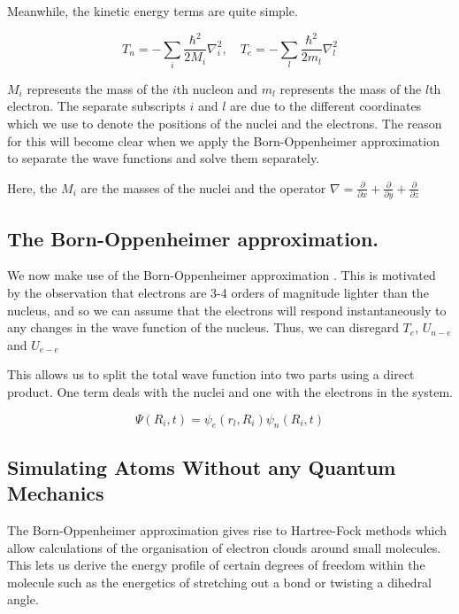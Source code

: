 Meanwhile, the kinetic energy terms are quite simple. 

\begin {equation}
T_n = - \sum_i \frac{\hbar^2}{2M_i} \nabla_i ^2,\quad  T_e = - \sum_l \frac{\hbar^2}{2m_l} \nabla_l ^2
\end {equation}

$M_i$ represents the mass of the $i$th nucleon and $m_l$ represents the mass of the $l$th electron. The separate subscripts $i$ and $l$ are due to the different coordinates which we use to denote the positions of the nuclei and the electrons. The reason for this will become clear when we apply the Born-Oppenheimer approximation to separate the wave functions and solve them separately.

Here, the $M_i$ are the masses of the nuclei and the operator $\nabla = \frac{\partial}{\partial x} + \frac{\partial }{\partial y} + \frac{\partial}{\partial z} $


\subsection{The Born-Oppenheimer approximation.}
We now make use of the Born-Oppenheimer approximation \cite{Born1927}. This is motivated by the observation that electrons are 3-4 orders of magnitude lighter than the nucleus, and so we can assume that the electrons will respond instantaneously to any changes in the wave function of the nucleus. Thus, we can disregard $T_e$, $U_{n-e}$ and $U_{e-e}$ 


This allows us to split the total wave function into two parts using a direct product. One term deals with the nuclei and one with the electrons in the system. 

\begin {equation}
\Psi(R_i,t) = \psi_e (r_l,R_i) \psi_n(R_i,t)
\end {equation}

\subsection{Simulating Atoms Without any Quantum Mechanics}
The Born-Oppenheimer approximation gives rise to Hartree-Fock methods which allow calculations of the organisation of electron clouds around small molecules. This lets us derive the energy profile of certain degrees of freedom within the molecule such as the energetics of stretching out a bond or twisting a dihedral angle. 

